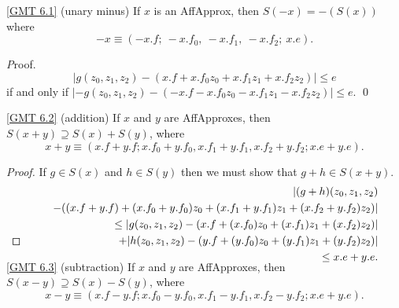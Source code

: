 \begin{proposition}{\ref{GMT 6.1} {\textrm (unary minus)}} If $x$ is an {\textrm AffApprox,} then 
$S(-x) = -(S(x))$ where 
$$-x \equiv (-x.f;\ -x.f_0,\ -x.f_1,\ -x.f_2;\ x.e).$$ 
\end{proposition}

{\textit Proof}.
$$|g(z_0,z_1,z_2) - (x.f + x.f_0 z_0 + x.f_1 z_1 + x.f_2 z_2)| \le e$$
if and only if 
\hfill $|-g(z_0,z_1,z_2) - (-x.f - x.f_0 z_0 - x.f_1 z_1 - x.f_2 z_2)| \le e.$ \hfill\qed


\begin{proposition}{\ref{GMT 6.2} {\textrm (addition)}} \hskip-8pt If $x$ and $y$ are {\textrm AffApproxes,} then $S(x + y) \supseteq S(x)
+ S(y)${\textrm ,} where
$$x + y \equiv (x.f + y.f; x.f_0 + y.f_0, x.f_1 + y.f_1, x.f_2 + y.f_2; x.e + y.e).$$
\end{proposition}  

\begin{proof}{}  If $g\in S(x)$ and $h \in S(y)$ then we must show that $g + h \in S(x + y).$
\begin{eqnarray*}
&&|(g + h)(z_0,z_1,z_2) \\
&&\quad- ((x.f + y.f) + (x.f_0 + y.f_0) z_0 + (x.f_1 + y.f_1) z_1 + (x.f_2 + y.f_2) z_2)| \\
&&\qquad 
\le |g(z_0,z_1,z_2) - 
(x.f + (x.f_0) z_0 + (x.f_1) z_1 + (x.f_2) z_2)| \\
&&\quad\qquad + 
|h(z_0,z_1,z_2) - (y.f + (y.f_0) z_0 + (y.f_1) z_1 + (y.f_2) z_2)| 
                                        \\
&&\qquad \le x.e + y.e.\\
\noalign{\vskip-36pt}
\end{eqnarray*}
\end{proof}

\begin{proposition}{\ref{GMT 6.3} {\textrm (subtraction)}} \hskip-8pt If $x$ and $y$ are {\textrm AffApproxes,} then $S(x - y) \supseteq
S(x) - S(y)${\textrm ,}
 where
$$x - y \equiv (x.f - y.f; x.f_0 - y.f_0, x.f_1 - y.f_1, x.f_2 - y.f_2; x.e + y.e).$$ 
\end{proposition}

